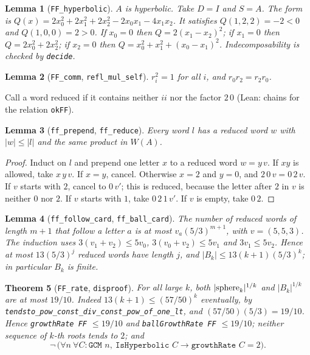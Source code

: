 \documentclass[11pt]{article}
\newtheorem{theorem}{Theorem}
\newtheorem{lemma}[theorem]{Lemma}
\theoremstyle{definition}
\begin{document}
\begin{lemma}[\texttt{FF\_hyperbolic}]
$A$ is hyperbolic. Take $D=I$ and $S=A$. The form is
$Q(x)=2x_0^2+2x_1^2+2x_2^2-2x_0x_1-4x_1x_2$. It satisfies $Q(1,2,2)=-2<0$ and $Q(1,0,0)=2>0$.
If $x_0=0$ then $Q=2(x_1-x_2)^2$; if $x_1=0$ then $Q=2x_0^2+2x_2^2$; if $x_2=0$ then
$Q=x_0^2+x_1^2+(x_0-x_1)^2$. Indecomposability is checked by \texttt{decide}.
\end{lemma}

\begin{lemma}[\texttt{FF\_comm}, \texttt{refl\_mul\_self}]
$r_i^2=1$ for all $i$, and $r_0r_2=r_2r_0$.
\end{lemma}

Call a word reduced if it contains neither $ii$ nor the factor $2\,0$ (Lean: chains for the
relation \texttt{okFF}).

\begin{lemma}[\texttt{ff\_prepend}, \texttt{ff\_reduce}]
Every word $l$ has a reduced word $w$ with $|w|\le|l|$ and the same product in $W(A)$.
\end{lemma}
\begin{proof}
Induct on $l$ and prepend one letter $x$ to a reduced word $w=y\,v$. If $xy$ is allowed, take
$x\,y\,v$. If $x=y$, cancel. Otherwise $x=2$ and $y=0$, and $2\,0\,v=0\,2\,v$. If $v$ starts
with $2$, cancel to $0\,v'$; this is reduced, because the letter after $2$ in $v$ is neither
$0$ nor $2$. If $v$ starts with $1$, take $0\,2\,1\,v'$. If $v$ is empty, take $0\,2$.
\end{proof}

\begin{lemma}[\texttt{ff\_follow\_card}, \texttt{ff\_ball\_card}]
The number of reduced words of length $m+1$ that follow a letter $a$ is at most
$v_a(5/3)^{m+1}$, with $v=(5,5,3)$. The induction uses $3(v_1+v_2)\le 5v_0$,
$3(v_0+v_2)\le 5v_1$ and $3v_1\le 5v_2$. Hence at most $13(5/3)^j$ reduced words have length
$j$, and $|B_k|\le 13(k+1)(5/3)^k$; in particular $B_k$ is finite.
\end{lemma}

\begin{theorem}[\texttt{FF\_rate}, \texttt{disproof}]
For all large $k$, both $|{\rm sphere}_k|^{1/k}$ and $|B_k|^{1/k}$ are at most $19/10$. Indeed
$13(k+1)\le(57/50)^k$ eventually, by \texttt{tendsto\_pow\_const\_div\_const\_pow\_of\_one\_lt},
and $(57/50)(5/3)=19/10$. Hence \texttt{growthRate FF} $\le 19/10$ and
\texttt{ballGrowthRate FF} $\le 19/10$; neither sequence of $k$-th roots tends to $2$; and
\[
\neg\,\bigl(\forall n\ \forall C:\texttt{GCM }n,\ \texttt{IsHyperbolic }C\to
\texttt{growthRate }C=2\bigr).
\]
\end{theorem}
\end{document}
